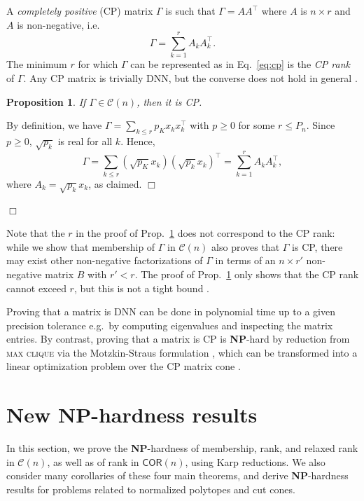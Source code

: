 \documentclass[envcountsect,envcountsame]{svjour3}
\theoremstyle{changebreak}                %
\newtheorem{proposition}[result]{Proposition}
\newenvironment{proof}
 {{\sl Proof.}\hspace*{1 ex}}%
 {{\nopagebreak\hspace*{\fill}$\Box$\par\vspace{12pt}}}
\newcommand{\qed}{\hfill \ensuremath{\Box}}
\newcommand{\transpose}[1]{{#1}^{\top}}
\newcommand{\COR}[1]{\mathsf{COR}(#1)}
\newcommand{\CONX}[1]{\mathcal{C}(#1)}
\begin{document}
A \textit{completely positive} (CP) matrix $\Gamma$ is such that $\Gamma=A\transpose{A}$ where $A$ is $n\times r$ and $A$ is non-negative, i.e.
\begin{equation}
  \Gamma = \sum\limits_{k=1}^r A_{k}\transpose{A}_{k}.
  \label{eq:cp}
\end{equation}
The minimum $r$ for which $\Gamma$ can be represented as in Eq.~\eqref{eq:cp} is the {\it CP rank} of $\Gamma$. Any CP matrix is trivially DNN, but the converse does not hold in general \cite{berman}.
\begin{proposition}
If $\Gamma\in\CONX{n}$, then it is CP. \label{prop:cp}
\end{proposition}
\begin{proof}
  By definition, we have $\Gamma=\sum_{k\le r} p_K x_k\transpose{x}_k$ with $p\ge 0$ for some $r\le P_n$. Since $p\ge 0$, $\sqrt{p_k}$ is real for all $k$. Hence,
  \[\Gamma=\sum\limits_{k\le r}(\sqrt{p_K}x_k)\transpose{(\sqrt{p_k}x_k)}=\sum\limits_{k=1}^r A_{k}\transpose{A}_{k}, \]
  where $A_k=\sqrt{p_k}x_k$, as claimed.  \ifspringer\qed\fi
\end{proof}
Note that the $r$ in the proof of Prop.~\ref{prop:cp} does not correspond to the CP rank: while we show that membership of $\Gamma$ in $\CONX{n}$ also proves that $\Gamma$ is CP, there may exist other non-negative factorizations of $\Gamma$ in terms of an $n\times r'$ non-negative matrix $B$ with $r'<r$. The proof of Prop.~\ref{prop:cp} only shows that the CP rank cannot exceed $r$, but this is not a tight bound \cite[Thm.~3.5]{berman}.

Proving that a matrix is DNN can be done in polynomial time up to a given precision tolerance e.g.~by computing eigenvalues and inspecting the matrix entries. By contrast, proving that a matrix is CP is \textbf{NP}-hard by reduction from \textsc{max clique} via the Motzkin-Straus formulation \cite{motzkinstraus}, which can be transformed into a linear optimization problem over the CP matrix cone \cite{murty}. 

\section{New \textbf{NP}-hardness results}
\label{s:hardness}
In this section, we prove the \textbf{NP}-hardness of membership, rank, and relaxed rank in $\CONX{n}$, as well as of rank in $\COR{n}$, using Karp reductions. We also consider many corollaries of these four main theorems, and derive \textbf{NP}-hardness results for problems related to normalized polytopes and cut cones.
\end{document}
